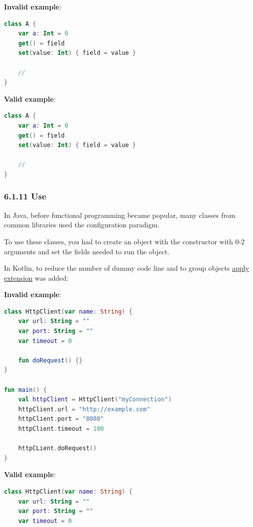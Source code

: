 {{{{\textbf{Invalid example}:

\begin{lstlisting}[language=Kotlin]
class A {
    var a: Int = 0 
    get() = field
    set(value: Int) { field = value }

    //
}
\end{lstlisting}


\textbf{Valid example}:

\begin{lstlisting}[language=Kotlin]
class A {
    var a: Int = 0 
    get() = field
    set(value: Int) { field = value }

    //
}
\end{lstlisting}


\subsubsection*{\textbf{6.1.11 Use}}
\leavevmode\newline

In Java, before functional programming became popular, many classes from common libraries used the configuration paradigm.

To use these classes, you had to create an object with the constructor with 0-2 arguments and set the fields needed to run the object.

In Kotlin, to reduce the number of dummy code line and to group objects \href{https://kotlinlang.org/api/latest/jvm/stdlib/kotlin/apply.html}{apply extension} was added:  

 

\textbf{Invalid example}:

\begin{lstlisting}[language=Kotlin]
class HttpClient(var name: String) {
    var url: String = ""
    var port: String = ""
    var timeout = 0
    
    fun doRequest() {}
}

fun main() {
    val httpClient = HttpClient("myConnection")
    httpClient.url = "http://example.com"
    httpClient.port = "8080"
    httpClient.timeout = 100
    
    httpCLient.doRequest()
}   

\end{lstlisting}


\textbf{Valid example}:

\begin{lstlisting}[language=Kotlin]
class HttpClient(var name: String) {
    var url: String = ""
    var port: String = ""
    var timeout = 0


\end{lstlisting}}}}}
